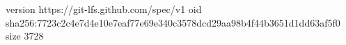 version https://git-lfs.github.com/spec/v1
oid sha256:7723c2c4e7d4e10e7eaf77e69e340c3578dcd29aa98b4f44b3651d1dd63af5f0
size 3728
